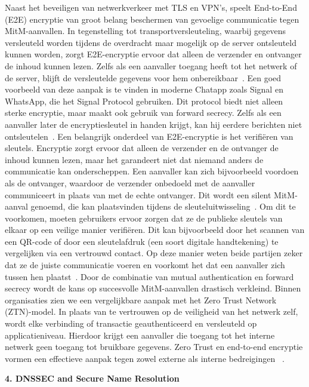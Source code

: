 Naast het beveiligen van netwerkverkeer met TLS en VPN’s, speelt End-to-End (E2E) encryptie van groot belang beschermen van gevoelige communicatie tegen MitM-aanvallen. In tegenstelling tot transportversleuteling, waarbij gegevens versleuteld worden tijdens de overdracht maar mogelijk op de server ontsleuteld kunnen worden, zorgt E2E-encryptie ervoor dat alleen de verzender en ontvanger de inhoud kunnen lezen. Zelfs als een aanvaller toegang heeft tot het netwerk of de server, blijft de versleutelde gegevens voor hem onbereikbaar~\autocite{SHURSON2024}.
Een goed voorbeeld van deze aanpak is te vinden in moderne Chatapp zoals Signal en WhatsApp, die het Signal Protocol gebruiken. Dit protocol biedt niet alleen sterke encryptie, maar maakt ook gebruik van forward secrecy. Zelfs als een aanvaller later de encryptiesleutel in handen krijgt, kan hij eerdere berichten niet ontsleutelen~\autocite{SHURSON2024}. 
Een belangrijk onderdeel van E2E-encryptie is het verifiëren van sleutels. Encryptie zorgt ervoor dat alleen de verzender en de ontvanger de inhoud kunnen lezen, maar het garandeert niet dat niemand anders de communicatie kan onderscheppen. Een aanvaller kan zich bijvoorbeeld voordoen als de ontvanger, waardoor de verzender onbedoeld met de aanvaller communiceert in plaats van met de echte ontvanger. Dit wordt een silent MitM-aanval genoemd, die kan plaatsvinden tijdens de sleuteluitwisseling~\autocite{eitca2024}.
Om dit te voorkomen, moeten gebruikers ervoor zorgen dat ze de publieke sleutels van elkaar op een veilige manier verifiëren. Dit kan bijvoorbeeld door het scannen van een QR-code of door een sleutelafdruk (een soort digitale handtekening) te vergelijken via een vertrouwd contact. Op deze manier weten beide partijen zeker dat ze de juiste communicatie voeren en voorkomt het dat een aanvaller zich tussen hen plaatst~\autocite{effkeyverification2025}.
Door de combinatie van mutual authentication en forward secrecy wordt de kans op succesvolle MitM-aanvallen drastisch verkleind. Binnen organisaties zien we een vergelijkbare aanpak met het Zero Trust Network (ZTN)-model. In plaats van te vertrouwen op de veiligheid van het netwerk zelf, wordt elke verbinding of transactie geauthenticeerd en versleuteld op applicatieniveau. Hierdoor krijgt een aanvaller die toegang tot het interne netwerk geen toegang tot bruikbare gegevens. Zero Trust en end-to-end encryptie vormen een effectieve aanpak tegen zowel externe als interne bedreigingen ~\autocite{microsoft2024}.

\vspace{0.5cm}
\textbf{4. DNSSEC and Secure Name Resolution}
\vspace{0.5cm}


